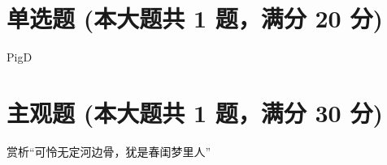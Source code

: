 \documentclass[12pt, a4paper, addpoints]{exam}
\begin{document}
\hspace{5cm}

\section{\normalsize{单选题 (本大题共 1 题，满分 20 分)}}
\hspace{1.5cm}

\begin{questions}
\question[20] PigD

\begin{oneparchoices}
\end{oneparchoices}

\end{questions}

\hspace{5cm}

\section{\normalsize{主观题 (本大题共 1 题，满分 30 分)}}
\hspace{1.5cm}

\begin{questions}
\question[30] 赏析“可怜无定河边骨，犹是春闺梦里人”

\end{questions}
\end{document}
